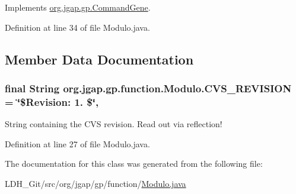 Implements \hyperlink{classorg_1_1jgap_1_1gp_1_1_command_gene_a236141d99059da808afe7a9217e411c7}{org.\-jgap.\-gp.\-Command\-Gene}.



Definition at line 34 of file Modulo.\-java.



\subsection{Member Data Documentation}
\hypertarget{classorg_1_1jgap_1_1gp_1_1function_1_1_modulo_aa198a42c73a32e5d99733f5121bd2da2}{
\subsubsection[{C\-V\-S\-\_\-\-R\-E\-V\-I\-S\-I\-O\-N}]{\setlength{\rightskip}{0pt plus 5cm}final String org.\-jgap.\-gp.\-function.\-Modulo.\-C\-V\-S\-\_\-\-R\-E\-V\-I\-S\-I\-O\-N = \char`\"{}\$Revision\-: 1. \$\char`\"{}\hspace{0.3cm}{\ttfamily [static]}, {\ttfamily [private]}}}\label{classorg_1_1jgap_1_1gp_1_1function_1_1_modulo_aa198a42c73a32e5d99733f5121bd2da2}
String containing the C\-V\-S revision. Read out via reflection! 

Definition at line 27 of file Modulo.\-java.



The documentation for this class was generated from the following file\-:\begin{DoxyCompactItemize}
\item 
L\-D\-H\-\_\-\-Git/src/org/jgap/gp/function/\hyperlink{_modulo_8java}{Modulo.\-java}\end{DoxyCompactItemize}
